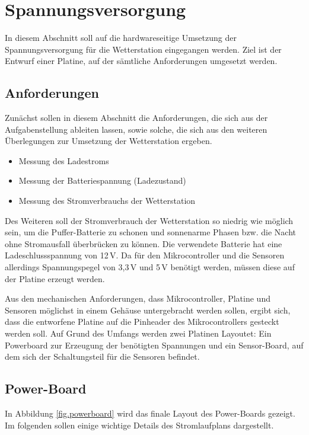 \pagebreak
\section{Spannungsversorgung}\label{sec.spannungsversorgung}
In diesem Abschnitt soll auf die hardwareseitige Umsetzung der Spannungsversorgung für die Wetterstation eingegangen werden. Ziel ist der Entwurf einer Platine, auf der sämtliche Anforderungen umgesetzt werden.

\subsection{Anforderungen}\label{subsec.anforderungen}
Zunächst sollen in diesem Abschnitt die Anforderungen, die sich aus der Aufgabenstellung ableiten lassen, sowie solche, die sich aus den weiteren Überlegungen zur Umsetzung der Wetterstation ergeben.

\begin{itemize}

	\item Messung des Ladestroms
	\item Messung der Batteriespannung (Ladezustand)
	\item Messung des Stromverbrauchs der Wetterstation

\end{itemize}

Des Weiteren soll der Stromverbrauch der Wetterstation so niedrig wie möglich sein, um die Puffer-Batterie zu schonen und sonnenarme Phasen bzw. die Nacht ohne Stromausfall überbrücken zu können. Die verwendete Batterie hat eine Ladeschlussspannung von 12\,V. Da für den Mikrocontroller und die Sensoren allerdings Spannungspegel von 3,3\,V und 5\,V benötigt werden, müssen diese auf der Platine erzeugt werden.

Aus den mechanischen Anforderungen, dass Mikrocontroller, Platine und Sensoren möglichst in einem Gehäuse untergebracht werden sollen, ergibt sich, dass die entworfene Platine auf die Pinheader des Mikrocontrollers gesteckt werden soll. Auf Grund des Umfangs werden zwei Platinen Layoutet: Ein Powerboard zur Erzeugung der benötigten Spannungen und ein Sensor-Board, auf dem sich der Schaltungsteil für die Sensoren befindet.

\subsection{Power-Board}
In Abbildung \ref{fig.powerboard} wird das finale Layout des Power-Boards gezeigt. Im folgenden sollen einige wichtige Details des Stromlaufplans dargestellt.


